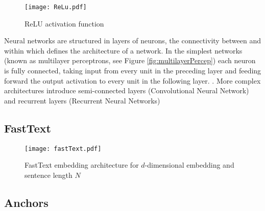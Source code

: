 \documentclass[Dissertation.tex]{subfiles}
\begin{document}
\begin{figure}
	\centering
	\texttt{[image: ReLu.pdf]}

	\caption{ReLU activation function}
	\label{fig:ReLU}

\end{figure}

Neural networks are structured in layers of neurons, the connectivity between and within which defines the architecture of a network. In the simplest networks (known as multilayer perceptrons, see Figure \ref{fig:multilayerPercep}) each neuron is fully connected, taking input from every unit in the preceding layer and feeding forward the output activation to every unit in the following layer. \cite{pattersonDeepLearningPractitioner2017}. More complex architectures introduce semi-connected layers (Convolutional Neural Network) and recurrent layers (Recurrent Neural Networks)\cite{pattersonDeepLearningPractitioner2017}

\cite{jurafskySpeechLanguageProcessing}


\subsection{FastText}
\begin{figure}
	\texttt{[image: fastText.pdf]}
	\caption{FastText embedding architecture for $ d $-dimensional embedding and sentence length $ N $}
\end{figure}
\subsection{Anchors}
\end{document}
